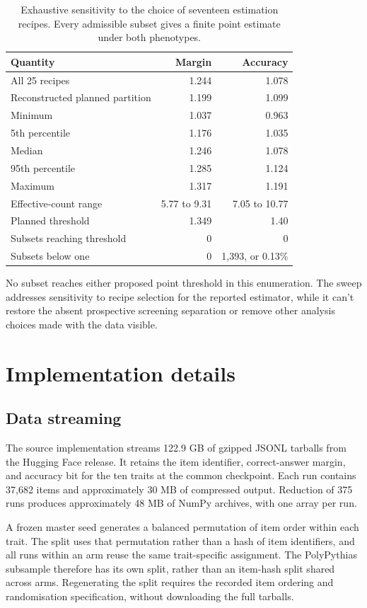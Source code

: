 \begin{table}[htbp]
\centering\small
\caption{Exhaustive sensitivity to the choice of seventeen estimation recipes. Every admissible subset gives a finite point estimate under both phenotypes.}
\label{tab:original14}
\begin{tabular}{lrr}\hline
Quantity & Margin & Accuracy\\\hline
All 25 recipes & 1.244 & 1.078\\
Reconstructed planned partition & 1.199 & 1.099\\
Minimum & 1.037 & 0.963\\
5th percentile & 1.176 & 1.035\\
Median & 1.246 & 1.078\\
95th percentile & 1.285 & 1.124\\
Maximum & 1.317 & 1.191\\
Effective-count range & 5.77 to 9.31 & 7.05 to 10.77\\
Planned threshold & 1.349 & 1.40\\
Subsets reaching threshold & 0 & 0\\
Subsets below one & 0 & 1,393, or 0.13\%\\\hline
\end{tabular}
\end{table}

No subset reaches either proposed point threshold in this enumeration. The sweep addresses sensitivity to recipe selection for the reported estimator, while it can't restore the absent prospective screening separation or remove other analysis choices made with the data visible.

\section{Implementation details}
\label{app:implementation}

\subsection{Data streaming}
The source implementation streams 122.9 GB of gzipped JSONL tarballs from the Hugging Face release. It retains the item identifier, correct-answer margin, and accuracy bit for the ten traits at the common checkpoint. Each run contains 37,682 items and approximately 30 MB of compressed output. Reduction of 375 runs produces approximately 48 MB of NumPy archives, with one array per run.

A frozen master seed generates a balanced permutation of item order within each trait. The split uses that permutation rather than a hash of item identifiers, and all runs within an arm reuse the same trait-specific assignment. The PolyPythias subsample therefore has its own split, rather than an item-hash split shared across arms. Regenerating the split requires the recorded item ordering and randomisation specification, without downloading the full tarballs.

